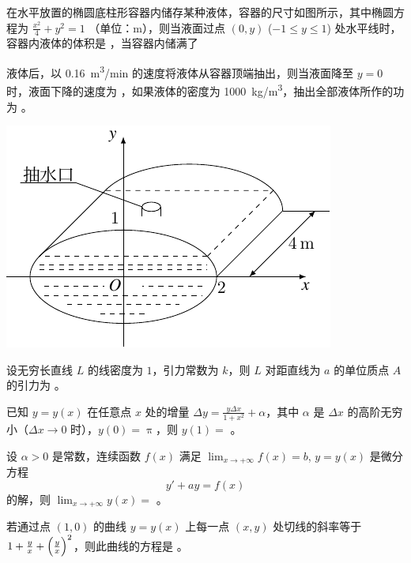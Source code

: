 \begin{ti}
	在水平放置的椭圆底柱形容器内储存某种液体，容器的尺寸如图所示，其中椭圆方程为 $\frac{x^2}{4} + y^2 = 1$ （单位：\si{m}），则当液面过点 $(0,y)$ ($-1 \leq y \leq 1$) 处水平线时，容器内液体的体积是 \hua，当容器内储满了
	\parbox[t]{0.4\textwidth}{\vspace{0pt}
	液体后，以 \SI{0.16}{m^3/min} 的速度将液体从容器顶端抽出，则当液面降至 $y = 0$ 时，液面下降的速度为 \hua，如果液体的密度为 \SI{1000}{kg/m^3}，抽出全部液体所作的功为 \hua。
	}%
	\parbox[t]{0.6\textwidth}{\centering\vspace{0pt}\includegraphics{figure/fig74.pdf}}
\end{ti}

\begin{ti}
	设无穷长直线 $L$ 的线密度为 $1$，引力常数为 $k$，则 $L$ 对距直线为 $a$ 的单位质点 $A$ 的引力为 \hua。
\end{ti}

\begin{ti}
	已知 $y = y(x)$ 在任意点 $x$ 处的增量 $\Delta y = \frac{y \Delta x}{1 + x^2} + \alpha$，其中 $\alpha$ 是 $\Delta x$ 的高阶无穷小（$\Delta x \to 0$ 时），$y(0) = \uppi$，则 $y(1) = $ \hua。
\end{ti}

\begin{ti}
	设 $\alpha > 0$ 是常数，连续函数 $f(x)$ 满足 $\lim_{x \to +\infty} f(x) = b$, $y = y(x)$ 是微分方程
	\[
		y' + ay = f(x)
	\]
	的解，则 $\lim_{x \to +\infty} y(x) = $ \hua。
\end{ti}

\begin{ti}
	若通过点 $(1,0)$ 的曲线 $y = y(x)$ 上每一点 $(x,y)$ 处切线的斜率等于 $1 + \frac{y}{x} + \Bigl( \frac{y}{x} \Bigr)^2$，则此曲线的方程是 \hua。
\end{ti}

